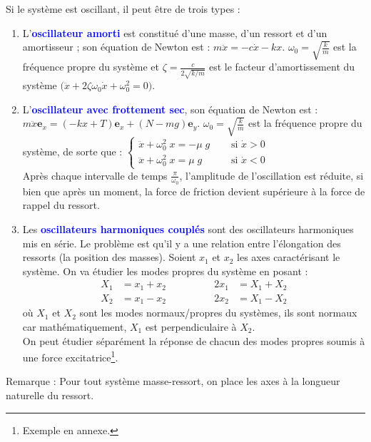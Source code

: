 \documentclass[a4paper]{article}
\begin{document}
\begin{tcolorbox}[title=D. Système oscillant, sharp corners, colback=white, colframe=blue]

Si le système est oscillant, il peut être de trois types : 
\begin{enumerate}
\item L'\textcolor{blue}{\textbf{oscillateur amorti}} est constitué d'une masse, d'un ressort et d'un amortisseur ; son équation de Newton est : $\displaystyle m \ddot{x} = - c \dot{x} - k x $. $\displaystyle \omega_0 = \sqrt{\frac{k}{m}} $ est la fréquence propre du système et $\displaystyle \zeta = \frac{c}{2 \sqrt{k/m}} $ est le facteur d'amortissement du système $ \Big( \ddot{x} + 2 \zeta \omega_0 \dot{x} + \omega_0^2 = 0 \Big) $.
\item L'\textcolor{blue}{\textbf{oscillateur avec frottement sec}}, son équation de Newton est : $\displaystyle m \ddot{x} \textbf{e}_x = (- k x + T) \textbf{e}_x + (N - m g) \textbf{e}_y $. $\displaystyle \omega_0 = \sqrt{\frac{k}{m}} $ est la fréquence propre du système, de sorte que : $\displaystyle \begin{cases} \ddot{x} + \omega_0^2 \; x = - \mu \; g \quad & \text{ si } \dot{x} > 0 \\ \ddot{x} + \omega_0^2 \; x = \mu \; g & \text{ si } \dot{x} < 0 \end{cases} $ \\
Après chaque intervalle de temps $\displaystyle \frac{\pi}{\omega_0} $, l'amplitude de l'oscillation est réduite, si bien que après un moment, la force de friction devient supérieure à la force de rappel du ressort.
\item Les \textcolor{blue}{\textbf{oscillateurs harmoniques couplés}} sont des oscillateurs harmoniques mis en série. Le problème est qu'il y a une relation entre l'élongation des ressorts (la position des masses). Soient $ x_1 $ et $ x_2 $ les axes caractérisant le système. On va étudier les modes propres du système en posant : 
\[ \begin{aligned} X_1 &= x_1 + x_2 \\ X_2 &= x_1 - x_2 \end{aligned} \qquad \qquad \begin{aligned} 2 x_1 &= X_1 + X_2 \\ 2 x_2 &= X_1 - X_2 \end{aligned} \]
où $ X_1 $ et $ X_2 $ sont les modes normaux/propres du systèmes, ils sont normaux car mathématiquement, $ X_1 $ est perpendiculaire à $ X_2 $. \\
On peut étudier séparément la réponse de chacun des modes propres soumis à une force excitatrice\footnote{Exemple en annexe.}.
\end{enumerate}
Remarque : Pour tout système masse-ressort, on place les axes à la longueur naturelle du ressort.

\end{tcolorbox}
\end{document}
